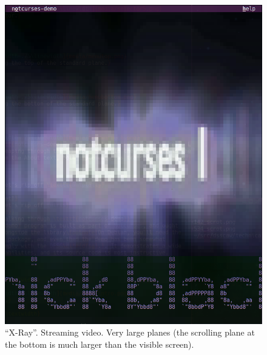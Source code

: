 \documentclass[letterpaper,10pt]{article}
\begin{document}
\begin{figure}
\begin{minipage}{0.45\textwidth}
    \includegraphics[width=1\linewidth]{media/demo-xray.png}
    \caption[``X-Ray''. Very large planes.]{``X-Ray''. Streaming video.
       Very large planes (the scrolling plane at the bottom is much larger than the visible screen).}
  \end{minipage}
\end{figure}
\end{document}
